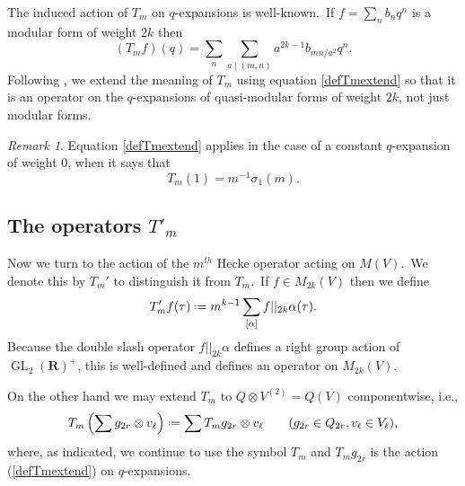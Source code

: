 \documentclass[12pt]{amsart}
\theoremstyle{plain}
\theoremstyle{definition}
\theoremstyle{remark}
\newtheorem{rmk}[thm]{Remark}
\DeclareMathOperator{\GL}{GL}
\newcommand*{\df}{\mathrel{\vcenter{\baselineskip0.5ex \lineskiplimit0pt
                     \hbox{\scriptsize.}\hbox{\scriptsize.}}} =}
\newcommand{\RR}{\mathbf{R}}
\begin{document}
The induced action of $T_m$ on $q$-expansions is well-known.\ If
$f=\sum_n b_nq^n$ is a modular form of weight $2k$ then
\begin{equation}
    \label{defTmextend}
  (T_mf)(q)=\sum_n\sum_{a\mid(m, n)}
a^{2k-1}b_{mn/a^2} q^n.
\end{equation} 
Following \cite{movasati}, we extend the meaning of $T_m$ using equation \eqref{defTmextend} so that it is an operator on the $q$-expansions of  quasi-modular forms of weight $2k$, not just modular forms.

\begin{rmk}\label{rmkTm}
Equation \eqref{defTmextend} applies in the case of a constant $q$-expansion of weight $0$, when it says that
$$T_m(1) =m^{-1}\sigma_1(m).$$
\end{rmk}
\subsection{The operators \texorpdfstring{$T'_m$}{T'm}}
Now we turn to the action of the $m^{th}$ Hecke operator acting on $M(V)$.\ We denote this by $T_m'$ to distinguish it from $T_m$.\ If $f\in M_{2k}(V)$ then we define
\[
T'_m f(\tau)\df m^{k-1}\sum_{[\alpha]} f||_{2k}\alpha(\tau).
\]
Because the double slash operator $f||_{2k}\alpha$ defines a right group action of $\GL_2(\RR)^+$, this is well-defined and defines an operator on $M_{2k}(V)$.

\medskip
On the other hand we may extend $T_m$ to $Q\otimes V^{(2)}=Q(V)$ componentwise, i.e.,
\begin{equation}\label{Tmextend}
T_{m}\left(\sum g_{2r}\otimes v_{\ell}   \right) \df \sum T_{m}g_{2r}\otimes v_{\ell}\quad\quad (g_{2r}\in Q_{2r}, v_{\ell}\in V_{\ell}),
\end{equation}
where, as indicated, we continue to use the symbol $T_m$ and $T_mg_{2r}$ is the action (\ref{defTmextend}) on $q$-expansions.
\end{document}
